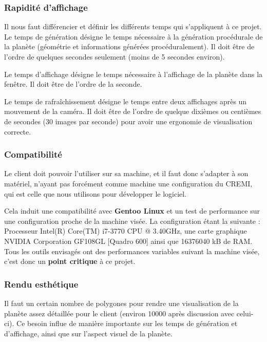 \documentclass[a4paper]{article}
\begin{document}
\subsubsection{Rapidité d'affichage}
Il nous faut différencier et définir les différents temps qui s'appliquent à ce projet. \\

Le temps de génération désigne le temps nécessaire à la génération procédurale de la planète (géométrie et informations générées procéduralement). Il doit être de l'ordre de quelques secondes seulement (moins de 5 secondes environ).
         
Le temps d'affichage désigne le temps nécessaire à l'affichage de la planète dans la fenêtre. Il doit être de l'ordre de la seconde.
         
Le temps de rafraîchissement désigne le temps entre deux affichages après un mouvement de la caméra. Il doit être de l'ordre de quelque dixièmes ou centièmes de secondes (30 images par seconde) pour avoir une ergonomie de visualisation correcte.
        
\subsubsection{Compatibilité} \label{Compatibilité}
        
Le client doit pouvoir l'utiliser sur sa machine, et il faut donc s'adapter à son matériel, n'ayant pas forcément comme machine une configuration du CREMI, qui est celle que nous utilisons pour développer le logiciel.
        
Cela induit une compatibilité avec \textbf{Gentoo Linux} et un test de performance sur une configuration proche de la machine visée. La configuration étant la suivante : Processeur Intel(R) Core(TM) i7-3770 CPU @ 3.40GHz, une carte graphique NVIDIA Corporation GF108GL [Quadro 600] ainsi que 16376040 kB de RAM. Tous les outils envisagés ont des performances variables suivant la machine visée, c'est donc un \textbf{point critique} à ce projet.
        
\subsubsection{Rendu esthétique}
        
Il faut un certain nombre de polygones pour rendre une visualisation de la planète assez détaillée pour le client (environ 10000 après discussion avec celui-ci). Ce besoin influe de manière importante sur les temps de génération et d'affichage, ainsi que sur l'aspect visuel de la planète.
\end{document}
